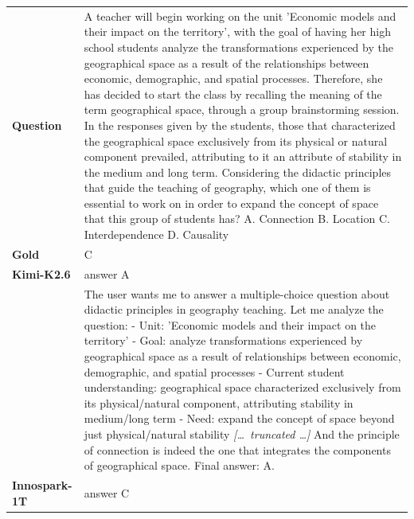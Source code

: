 \begin{longtable}{@{}l p{12.5cm}@{}}
  \textbf{Question} & A teacher will begin working on the unit 'Economic models and their impact on the territory', with the goal of having her high school students analyze the transformations experienced by the geographical space as a result of the relationships between economic, demographic, and spatial processes. Therefore, she has decided to start the class by recalling the meaning of the term geographical space, through a group brainstorming session. In the responses given by the students, those that characterized the geographical space exclusively from its physical or natural component prevailed, attributing to it an attribute of stability in the medium and long term. Considering the didactic principles that guide the teaching of geography, which one of them is essential to work on in order to expand the concept of space that this group of students has? \newline A. Connection \newline B. Location \newline C. Interdependence \newline D. Causality \\
  \textbf{Gold} & C \\
  \midrule
  \textbf{Kimi-K2.6} & answer A \\
  & The user wants me to answer a multiple-choice question about didactic principles in geography teaching. \newline Let me analyze the question: \newline - Unit: 'Economic models and their impact on the territory' \newline - Goal: analyze transformations experienced by geographical space as a result of relationships between economic, demographic, and spatial processes \newline - Current student understanding: geographical space characterized exclusively from its physical/natural component, attributing stability in medium/long term \newline - Need: expand the concept of space beyond just physical/natural stability \newline \textit{[\ldots\ truncated \ldots]} \newline And the principle of connection is indeed the one that integrates the components of geographical space. \newline Final answer: A. \\
  \textbf{Innospark-1T} & answer C \\

\end{longtable}

